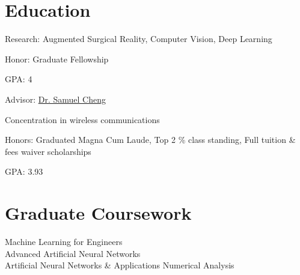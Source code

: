 
\begin{minipage}[t]{0.33\textwidth} %


\section{Education} 
\vspace{\topsep} %
\vspace{1pt}
\begin{tightitemize}
\item Research: Augmented Surgical Reality, Computer Vision, Deep Learning
\item Honor: Graduate Fellowship
\item GPA: 4
\item Advisor: \href{http://www.ou.edu/coe/ece/faculty_directory/dr_cheng}{Dr. Samuel Cheng} 
\end{tightitemize}
\vspace{6pt}

\begin{tightitemize}
\item Concentration in wireless communications
\item Honors: Graduated Magna Cum Laude, Top 2 \% class standing, Full tuition \& fees waiver scholarships
\item GPA: 3.93
\end{tightitemize}


\sectionspace %

\section{Graduate Coursework}
Machine Learning for Engineers \\
Advanced Artificial Neural Networks \\
Artificial Neural Networks \& Applications
Numerical Analysis \\


\end{minipage}
